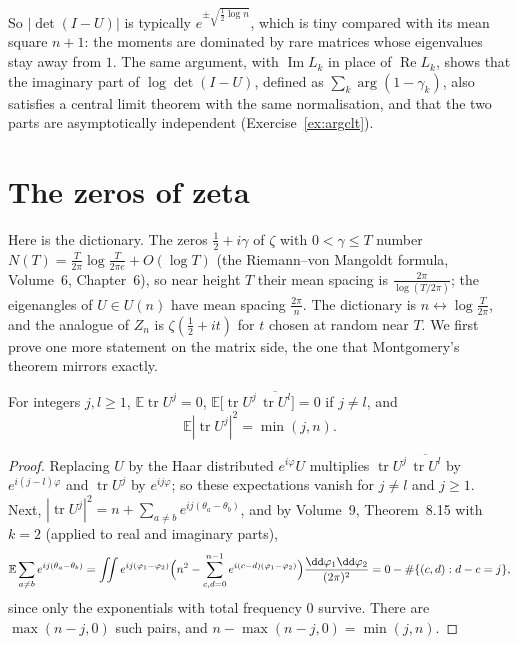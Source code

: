 So $|\det(I-U)|$ is typically $e^{\pm\sqrt{\frac12\log n}}$, which is tiny compared with its mean square $n+1$: the moments are dominated by rare matrices whose eigenvalues stay away from $1$. The same argument, with
$\operatorname{Im}L_k$ in place of $\operatorname{Re}L_k$, shows that the imaginary part of $\log\det(I-U)$, defined as $\sum_k\arg(1-\gamma_k)$, also satisfies a central limit theorem with the same normalisation, and that the
two parts are asymptotically independent (Exercise~\ref{ex:argclt}).

\section{The zeros of zeta}

Here is the dictionary. The zeros $\frac12+i\gamma$ of $\zeta$ with $0<\gamma\le T$ number $N(T)=\frac T{2\pi}\log\frac T{2\pi e}+O(\log T)$ (the Riemann--von Mangoldt formula, Volume~6, Chapter~6), so near height $T$ their mean spacing is
$\frac{2\pi}{\log(T/2\pi)}$; the eigenangles of $U\in U(n)$ have mean spacing $\frac{2\pi}n$. The dictionary is $n\leftrightarrow\log\frac T{2\pi}$, and the analogue of $Z_n$ is $\zeta(\frac12+it)$ for $t$ chosen at random near $T$. We first prove one
more statement on the matrix side, the one that Montgomery's theorem mirrors exactly.

\begin{proposition}\label{prop:formfactor}
For integers $j,l\ge1$, $\mathbb E\operatorname{tr}U^j=0$, $\mathbb E\bigl[\operatorname{tr}U^j\,\overline{\operatorname{tr}U^l}\bigr]=0$ if $j\ne l$, and
\[
\mathbb E|\operatorname{tr}U^j|^2=\min(j,n).
\]
\end{proposition}

\begin{proof}
Replacing $U$ by the Haar distributed $e^{i\varphi}U$ multiplies $\operatorname{tr}U^j\,\overline{\operatorname{tr}U^l}$ by $e^{i(j-l)\varphi}$ and $\operatorname{tr}U^j$ by $e^{ij\varphi}$; so these expectations vanish for $j\ne l$ and $j\ge1$. Next,
$|\operatorname{tr}U^j|^2=n+\sum_{a\ne b}e^{ij(\theta_a-\theta_b)}$, and by Volume~9, Theorem~8.15 with $k=2$ (applied to real and imaginary parts),
\[
\mathbb E\sum_{a\ne b}e^{ij(\theta_a-\theta_b)}=\iint e^{ij(\varphi_1-\varphi_2)}\Bigl(n^2-\sum_{c,d=0}^{n-1}e^{i(c-d)(\varphi_1-\varphi_2)}\Bigr)\frac{\dd\varphi_1\dd\varphi_2}{(2\pi)^2}=0-\#\{(c,d):d-c=j\},
\]
since only the exponentials with total frequency $0$ survive. There are $\max(n-j,0)$ such pairs, and $n-\max(n-j,0)=\min(j,n)$.
\end{proof}

